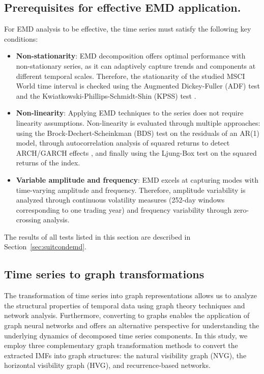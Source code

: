 \documentclass[11pt,a4paper]{article}
\begin{document}
\subsection{Prerequisites for effective EMD application.}

For EMD analysis to be effective, the time series must satisfy the following key conditions:

\begin{itemize}
\item \textbf{Non-stationarity}: EMD decomposition offers optimal performance with non-stationary series, as it can adaptively capture trends and components at different temporal scales. Therefore, the stationarity of the studied MSCI World time interval is checked using the Augmented Dickey-Fuller (ADF) test \citep{dickey1979distribution} and the Kwiatkowski-Phillips-Schmidt-Shin (KPSS) test \citep{kwiatkowski1992testing}.

\item \textbf{Non-linearity}: Applying EMD techniques to the series does not require linearity assumptions. Non-linearity is evaluated through multiple approaches: using the Brock-Dechert-Scheinkman (BDS) test \citep{brock1996test} on the residuals of an AR(1) model, through autocorrelation analysis of squared returns to detect ARCH/GARCH effects \citep{engle1982autoregressive,bollerslev1986generalized}, and finally using the Ljung-Box test \citep{ljung1978measure} on the squared returns of the index.

\item \textbf{Variable amplitude and frequency}: EMD excels at capturing modes with time-varying amplitude and frequency. Therefore, amplitude variability is analyzed through continuous volatility measures (252-day windows corresponding to one trading year) and frequency variability through zero-crossing analysis.
\end{itemize}

The results of all tests listed in this section are described in Section~\ref{sec:suitcondemd}.

\subsection{Time series to graph transformations}

The transformation of time series into graph representations allows us to analyze the structural properties of temporal data using graph theory techniques and network analysis. Furthermore, converting to graphs enables the application of graph neural networks and offers an alternative perspective for understanding the underlying dynamics of decomposed time series components. In this study, we employ three complementary graph transformation methods to convert the extracted IMFs into graph structures: the natural visibility graph (NVG), the horizontal visibility graph (HVG), and recurrence-based networks.
\end{document}
